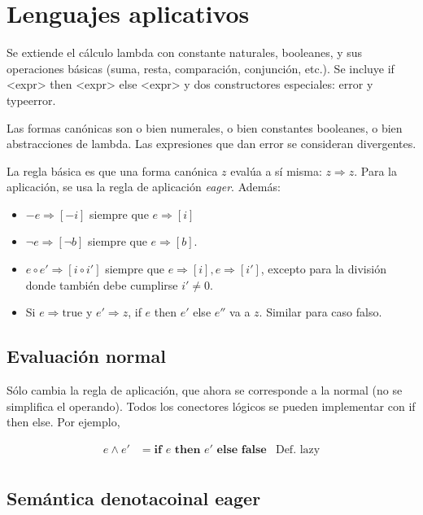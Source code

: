 \documentclass[article, 12pt]{article}
\begin{document}
\pagebreak 

\section{Lenguajes aplicativos}

Se extiende el cálculo lambda con constante naturales, booleanes, y sus
operaciones básicas (suma, resta, comparación, conjunción, etc.). Se incluye if
<expr> then <expr> else <expr> y dos constructores especiales: error y
typeerror. 

Las formas canónicas son o bien numerales, o bien constantes booleanes, o bien
abstracciones de lambda. Las expresiones que dan error se consideran
divergentes. 

La regla básica es que una forma canónica $z$ evalúa a sí misma: $z \Rightarrow
z$.
Para la aplicación, se usa la regla de aplicación \textit{eager}. Además: 

\begin{itemize}
  \item $-e \Rightarrow [-i]$ siempre que $e \Rightarrow [i]$ 
  \item $\neg e \Rightarrow [\neg b]$ siempre que $e \Rightarrow [b]$. 
  \item $e \circ e' \Rightarrow [i \circ i']$ siempre que $e \Rightarrow [i], e
    \Rightarrow [i']$, excepto para la división donde también debe cumplirse $i'
    \neq 0$. 
  \item Si $e \Rightarrow \text{true}$ y $e' \Rightarrow z$, if $e$ then $e'$
    else $e''$ va a $z$. Similar para caso falso.
\end{itemize}

\subsection{Evaluación normal}

Sólo cambia la regla de aplicación, que ahora se corresponde a la normal (no se
simplifica el operando). Todos los conectores lógicos se pueden implementar con
if then else. Por ejemplo, 

\begin{align*}
  e \land  e' &= \textbf{if } e \textbf{ then } e' \textbf{ else }
  \textbf{false} &\text{Def. lazy}\\
\end{align*}

\subsection{Semántica denotacoinal eager}
\end{document}
